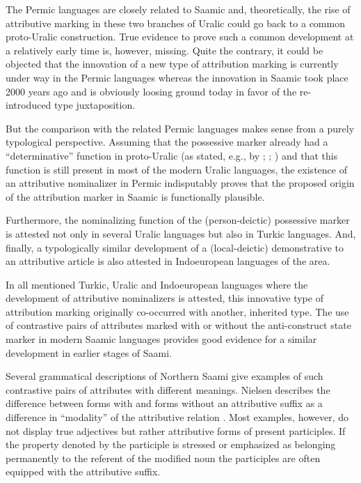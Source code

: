 {The Permic languages are closely related to Saamic and, theoretically, the rise of attributive marking in these two branches of Uralic could go back to a common proto-Uralic construction. True evidence to prove such a common development at a relatively early time is, however, missing. Quite the contrary, it could be objected that the innovation of a new type of attribution marking is currently under way in the Permic languages whereas the innovation in Saamic took place 2000 years ago and is obviously loosing ground today in favor of the re-introduced type juxtaposition.

But the comparison with the related Permic languages makes sense from a purely typological perspective. Assuming that the possessive marker already had a “determinative” function in proto-Uralic (as stated, e.g., by \citealt[32]{janhunen1981}; \citealt[66, 81]{decsy1990}; \citealt{kunnap2004}) and that this function is still present in most of the modern Uralic languages, the existence of an attributive nominalizer in Permic indisputably proves that the proposed origin of the attribution marker in Saamic is functionally plausible.

Furthermore, the nominalizing function of the (person-deictic) possessive marker is attested not only in several Uralic languages but also in Turkic languages. And, finally, a typologically similar development of a (local-deictic) demonstrative to an attributive article is also attested in Indoeuropean languages of the area.

In all mentioned Turkic, Uralic and Indoeuropean languages where the development of attributive nominalizers is attested, this innovative type of attribution marking originally co-occurred with another, inherited type. The use of contrastive pairs of attributes marked with or without the anti-construct state marker in modern Saamic languages provides good evidence for a similar development in earlier stages of Saami.

Several grammatical descriptions of Northern Saami give examples of such contrastive pairs of attributes with different meanings. Nielsen describes the difference between forms with and forms without an attributive suffix as a difference in “modality” of the attributive relation \cite[203]{nielsen1945b}. Most examples, however, do not display true adjectives but rather attributive forms of present participles. If the property denoted by the participle is stressed or emphasized as belonging permanently to the referent of the modified noun the participles are often equipped with the attributive suffix.

}
